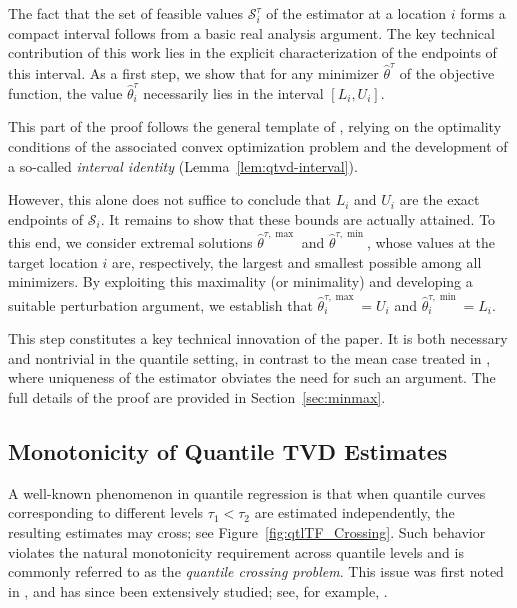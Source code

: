 \documentclass[11pt]{article}
\newcommand{\cS}{\mathcal{S}}
\theoremstyle{plain}
\theoremstyle{definition}
\theoremstyle{remark}
\begin{document}
The fact that the set of feasible values $\cS^{\tau}_i$ of the estimator at a location $i$ forms a compact interval follows from a basic real analysis argument. The key technical contribution of this work lies in the explicit characterization of the endpoints of this interval. As a first step, we show that for any minimizer $\hat{\theta}^{\tau}$ of the objective function, the value $\hat{\theta}^{\tau}_i$ necessarily lies in the interval $[L_i, U_i]$. 

This part of the proof follows the general template of \cite{chatterjee2026minmaxtrendfilteringgeneralizations}, relying on the optimality conditions of the associated convex optimization problem and the development of a so-called \emph{interval identity} (Lemma~\ref{lem:qtvd-interval}).

However, this alone does not suffice to conclude that $L_i$ and $U_i$ are the exact endpoints of $\cS_i$. It remains to show that these bounds are actually attained. To this end, we consider extremal solutions $\hat{\theta}^{\tau,\max}$ and $\hat{\theta}^{\tau,\min}$, whose values at the target location $i$ are, respectively, the largest and smallest possible among all minimizers. By exploiting this maximality (or minimality) and developing a suitable perturbation argument, we establish that $\hat{\theta}^{\tau,\max}_i = U_i$ and $\hat{\theta}^{\tau,\min}_i = L_i$.

This step constitutes a key technical innovation of the paper. It is both necessary and nontrivial in the quantile setting, in contrast to the mean case treated in \cite{chatterjee2026minmaxtrendfilteringgeneralizations}, where uniqueness of the estimator obviates the need for such an argument. The full details of the proof are provided in Section~\ref{sec:minmax}.




\subsection{Monotonicity of Quantile TVD Estimates}\label{sec:intro_noncrossing}
 A well-known phenomenon in quantile regression is that when quantile curves corresponding to different levels $\tau_1 < \tau_2$ are estimated independently, the resulting estimates may cross; see Figure~\ref{fig:qtlTF_Crossing}. Such behavior violates the natural monotonicity requirement across quantile levels and is commonly referred to as the \emph{quantile crossing problem}. This issue was first noted in \cite{bassett1982empirical}, and has since been extensively studied; see, for example, \cite{he1997quantile, chernozhukov2010quantile, JMLR:v7:takeuchi06a, bondell2010noncrossing}.
\end{document}
